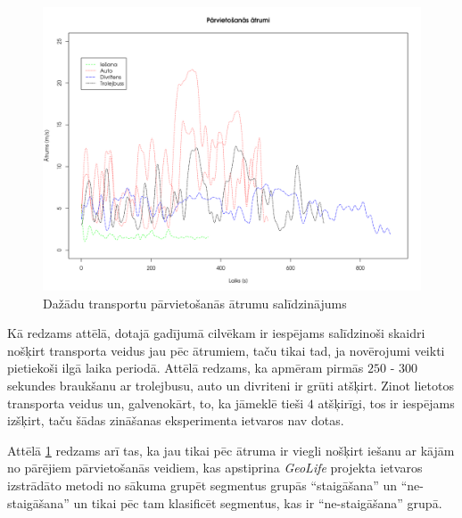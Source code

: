 \documentclass{ludis}
\begin{document}
\begin{figure}
  \centering
  \includegraphics[scale=0.5]{img/speed_comparison}
  \caption{Dažādu transportu pārvietošanās ātrumu salīdzinājums}
  \label{fig:speed_comparison}
\end{figure}

Kā redzams attēlā, dotajā gadījumā cilvēkam ir iespējams salīdzinoši skaidri nošķirt transporta 
veidus jau pēc ātrumiem, taču tikai tad, ja novērojumi veikti pietiekoši ilgā laika periodā.
Attēlā redzams, ka apmēram pirmās $250$ - $300$ sekundes braukšanu ar trolejbusu, auto un divriteni
ir grūti atšķirt. Zinot lietotos transporta veidus un, galvenokārt, to, ka jāmeklē tieši $4$ 
atšķirīgi, tos ir iespējams izšķirt, taču šādas zināšanas eksperimenta ietvaros nav dotas.

Attēlā \ref{fig:speed_comparison} redzams arī tas, ka jau tikai pēc ātruma ir viegli nošķirt iešanu
ar kājām no pārējiem pārvietošanās veidiem, kas apstiprina \emph{GeoLife} projekta ietvaros
izstrādāto metodi no sākuma grupēt segmentus grupās ``staigāšana'' un ``ne-staigāšana'' un tikai
pēc tam klasificēt segmentus, kas ir ``ne-staigāšana'' grupā. ~\cite{zheng_gps_segmentation}
\end{document}
